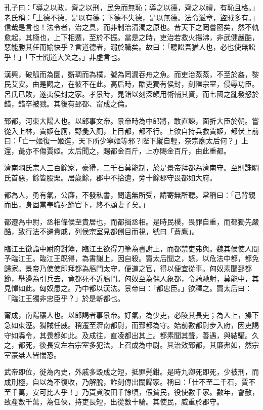 
\begin{pinyinscope}
孔子曰：「導之以政，齊之以刑，民免而無恥；導之以德，齊之以禮，有恥且格。」老氏稱：「上德不德，是以有德；下德不失德，是以無德。法令滋章，盜賊多有。」信哉是言也！法令者，治之具，而非制治清濁之原也。昔天下之罔嘗密矣，然不軌愈起，其極也，上下相遁，至於不振。當是之時，吏治若救火揚沸，非武健嚴酷，惡能勝其任而媮快乎？言道德者，溺於職矣。故曰：「聽訟吾猶人也，必也使無訟乎！」「下士聞道大笑之。」非虛言也。

漢興，破觚而為圜，斲琱而為樸，號為罔漏吞舟之魚。而吏治蒸蒸，不至於姦，黎民艾安。由是觀之，在彼不在此。高后時，酷吏獨有侯封，刻轢宗室，侵辱功臣。呂氏已敗，遂夷侯封之家。孝景時，晁錯以刻深頗用術輔其資，而七國之亂發怒於錯，錯卒被戮。其後有郅都、甯成之倫。

郅都，河東大陽人也。以郎事文帝。景帝時為中郎將，敢直諫，面折大臣於朝。嘗從入上林，賈姬在廁，野彘入廁，上目都，都不行。上欲自持兵救賈姬，都伏上前曰：「亡一姬復一姬進，天下所少寧姬等邪？陛下縱自輕，奈宗廟太后何？」上還，彘亦不傷賈姬。太后聞之，賜都金百斤，上亦賜金百斤，由此重都。

濟南瞷氏宗人三百餘家，豪猾，二千石莫能制，於是景帝拜都為濟南守。至則誅瞷氏首惡，餘皆股栗。居歲餘，郡中不拾遺，旁十餘郡守畏都如大府。

都為人，勇有氣，公廉，不發私書，問遺無所受，請寄無所聽。常稱曰：「己背親而出，身固當奉職死節官下，終不顧妻子矣。」

都遷為中尉，丞相條侯至貴居也，而都揖丞相。是時民樸，畏罪自重，而都獨先嚴酷，致行法不避貴戚，列侯宗室見都側目而視，號曰「蒼鷹」。

臨江王徵詣中尉府對簿，臨江王欲得刀筆為書謝上，而都禁吏弗與。魏其侯使人間予臨江王。臨江王既得，為書謝上，因自殺。竇太后聞之，怒，以危法中都，都免歸家。景帝乃使使即拜都為鴈門太守，便道之官，得以便宜從事。匈奴素聞郅都節，舉邊為引兵去，竟都死不近鴈門。匈奴至為偶人象都，令騎馳射，莫能中，其見憚如此。匈奴患之。乃中都以漢法。景帝曰：「都忠臣。」欲釋之。竇太后曰：「臨江王獨非忠臣乎？」於是斬都也。

甯成，南陽穰人也。以郎謁者事景帝。好氣，為少吏，必陵其長吏；為人上，操下急如束溼。猾賊任威。稍遷至濟南都尉，而郅都為守。始前數都尉步入府，因吏謁守如縣令，其畏都如此。及成往，直凌都出其上。都素聞其聲，善遇，與結驩。久之，都死，後長安左右宗室多犯法，上召成為中尉。其治效郅都，其廉弗如，然宗室豪桀人皆惴恐。

武帝即位，徙為內史，外戚多毀成之短，抵罪髡鉗。是時九卿死即死，少被刑，而成刑極，自以為不復收，乃解脫，詐刻傳出關歸家。稱曰：「仕不至二千石，賈不至千萬，安可比人乎！」乃貰貣陂田千餘頃，假貧民，役使數千家。數年，會赦，致產數千萬，為任俠，持吏長短，出從數十騎。其使民，威重於郡守。


\end{pinyinscope}

